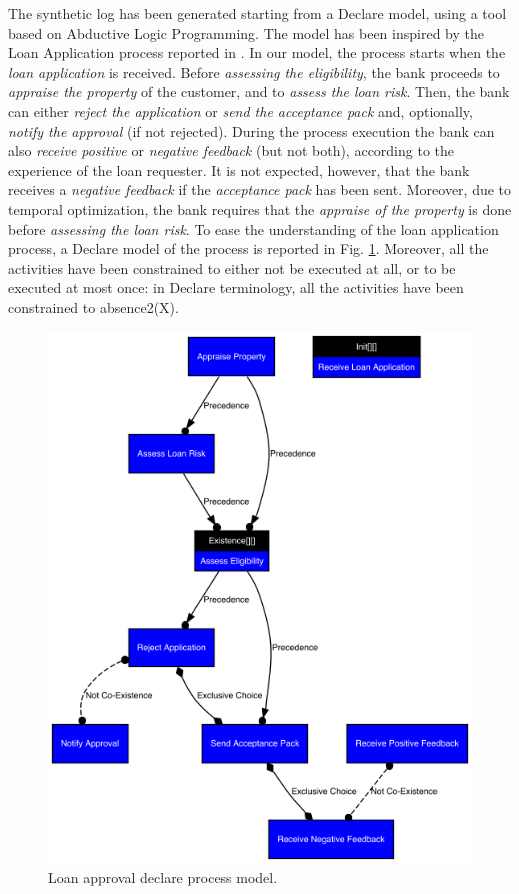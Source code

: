 \documentclass[a4wide,11pt]{article}
\theoremstyle{definition}
\theoremstyle{plain}
\begin{document}
The synthetic log has been generated starting from a Declare model, using a tool \cite{2020-Loreti} based on Abductive Logic Programming. The model has been inspired by the Loan Application process reported in \cite{DBLP:books/sp/DumasRMR18}. In our model, the process starts when the \emph{loan application} is received. Before \emph{assessing the eligibility}, the bank proceeds to \emph{appraise the property} of the customer, and to \emph{assess the loan risk}. Then, the bank can either \emph{reject the application} or \emph{send the acceptance pack} and, optionally, \emph{notify the approval} (if not rejected). During the process execution the bank can also \emph{receive positive} or \emph{negative feedback} (but not both), according to the experience of the loan requester. It is not expected, however, that the bank receives a \emph{negative feedback} if the \emph{acceptance pack} has been sent. Moreover, due to temporal optimization, the bank requires that the \emph{appraise of the property} is done before \emph{assessing the loan risk}.
To ease the understanding of the loan application process, a Declare model of the process is reported in Fig. \ref{fig:ex}. Moreover, all the activities have been constrained to either not be executed at all, or to be executed at most once: in Declare terminology, all the activities have been constrained to \textsf{absence2(X)}.

\begin{figure}[t]
\centering
\includegraphics[width=0.6\columnwidth]{example1}
\caption{Loan approval declare process model.}
\label{fig:ex}
\end{figure}
\end{document}
